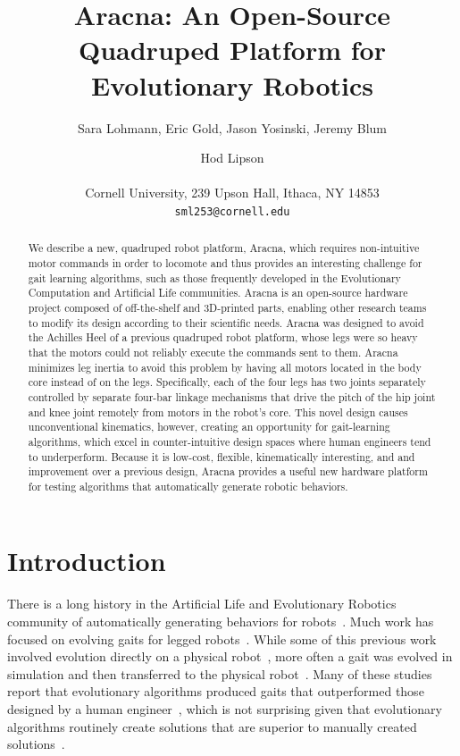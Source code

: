 \documentclass[letterpaper]{article}
\title{Aracna: An Open-Source Quadruped Platform for Evolutionary Robotics}
\author{Sara Lohmann, Eric Gold, Jason Yosinski, Jeremy Blum \and Hod Lipson \\
\mbox{}\\
Cornell University, 239 Upson Hall, Ithaca, NY 14853 \\
\texttt{sml253@cornell.edu}}
\begin{document}
\maketitle

\begin{abstract}
We describe a new, quadruped robot platform, Aracna,
which requires non-intuitive motor commands in order to locomote and thus provides an interesting challenge for gait learning algorithms, such as those frequently developed in the Evolutionary Computation and Artificial Life communities. Aracna is an open-source hardware project composed of off-the-shelf and 3D-printed parts, enabling other research teams to modify its design according to their scientific needs. Aracna was designed to avoid the Achilles Heel of a previous quadruped robot platform, whose legs were so heavy that the motors could not reliably execute the commands sent to them. Aracna minimizes leg inertia to avoid this problem by having all motors located in the body core instead of on the legs.  Specifically, each of the four legs has two joints separately controlled by separate four-bar linkage
mechanisms that drive the pitch of the hip joint and knee joint remotely from motors in the robot's core. 
This novel design causes unconventional kinematics, however, creating an opportunity for gait-learning algorithms, which excel in counter-intuitive design spaces where human engineers tend to underperform.  Because it is low-cost, flexible, kinematically interesting, and and improvement over a previous design, Aracna provides a useful new hardware platform for testing algorithms that automatically generate robotic behaviors. 
\end{abstract}



\section{Introduction}

There is a long history in the Artificial Life and Evolutionary Robotics community of automatically generating behaviors for robots~\citep{nolfi2000evolutionary, pfeifer2007body, sims1994evolving, hornby2005autonomous, lipson2000automatic}. Much work has focused on evolving gaits for legged robots~\citep{clune2009evolving, clune2011performance, hornby2005autonomous, hornby2003generative, kodjabachian1998evolution, Koos2012, bongard2006resilient, yosinski2011gaits, gallagher1996application}. While some of this previous work involved evolution directly on a physical robot~\citep{yosinski2011gaits, zykov2004evolving}, more often a gait was evolved in simulation and then transferred to the physical robot~\citep{lipson2006evolutionary, Koos2012, hornby2005autonomous, bongard2006resilient}. Many of these studies report that evolutionary algorithms produced gaits that outperformed those designed by a human engineer~\citep{yosinski2011gaits, hornby2005autonomous}, which is not surprising given that evolutionary algorithms routinely create solutions that are superior to manually created solutions~\citep{koza2003genetic}. 
\end{document}
